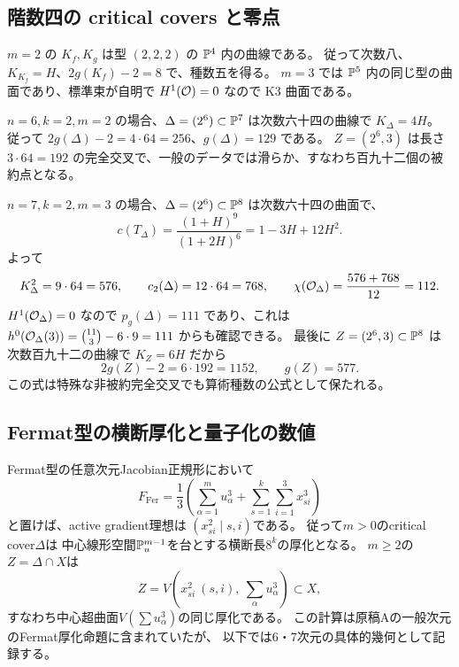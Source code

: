 \subsection{階数四の critical covers と零点}
$m=2$ の $K_f,K_g$ は型 $(2,2,2)$ の $\mathbb P^4$ 内の曲線である。
従って次数八、$K_{K_f}=H$、$2g(K_f)-2=8$ で、種数五を得る。
$m=3$ では $\mathbb P^5$ 内の同じ型の曲面であり、標準束が自明で $H^1(\mathcal O)=0$ なので K3 曲面である。

$n=6,k=2,m=2$ の場合、$\Delta=(2^6)\subset\mathbb P^7$ は次数六十四の曲線で $K_\Delta=4H$。
従って $2g(\Delta)-2=4\cdot64=256$、$g(\Delta)=129$ である。
$Z=(2^6,3)$ は長さ $3\cdot64=192$ の完全交叉で、一般のデータでは滑らか、すなわち百九十二個の被約点となる。

$n=7,k=2,m=3$ の場合、$\Delta=(2^6)\subset\mathbb P^8$ は次数六十四の曲面で、
\begin{equation}
c(T_\Delta)=\frac{(1+H)^9}{(1+2H)^6}=1-3H+12H^2.
\end{equation}
よって
\begin{equation}
K_\Delta^2=9\cdot64=576,\qquad c_2(\Delta)=12\cdot64=768,\qquad
\chi(\mathcal O_\Delta)=\frac{576+768}{12}=112.
\end{equation}
$H^1(\mathcal O_\Delta)=0$ なので $p_g(\Delta)=111$ であり、これは
$h^0(\mathcal O_\Delta(3))=\binom{11}{3}-6\cdot9=111$ からも確認できる。
最後に $Z=(2^6,3)\subset\mathbb P^8$ は次数百九十二の曲線で $K_Z=6H$ だから
\begin{equation}
2g(Z)-2=6\cdot192=1152,\qquad g(Z)=577.
\end{equation}
この式は特殊な非被約完全交叉でも算術種数の公式として保たれる。


\subsection{Fermat型の横断厚化と量子化の数値}
Fermat型の任意次元Jacobian正規形において
\begin{equation}
 F_{\mathrm{Fer}}
 =\frac13\left(
 \sum_{\alpha=1}^{m}u_\alpha^3+
 \sum_{s=1}^k\sum_{i=1}^3x_{si}^3
 \right)
 \label{eq:six-seven-fermat-form}
\end{equation}
と置けば、active gradient理想は
$(x_{si}^2\mid s,i)$である。
従って$m>0$のcritical cover$\Delta$は
中心線形空間$\mathbb P_u^{m-1}$を台とする横断長$8^k$の厚化となる。
$m\ge2$の$Z=\Delta\cap X$は
\begin{equation}
 Z=V\left(x_{si}^2\ (s,i),\
 \sum_\alpha u_\alpha^3\right)\subset X,
 \label{eq:six-seven-fermat-thickening}
\end{equation}
すなわち中心超曲面$V(\sum u_\alpha^3)$の同じ厚化である。
この計算は原稿Aの一般次元のFermat厚化命題に含まれていたが、
以下では6・7次元の具体的幾何として記録する。

